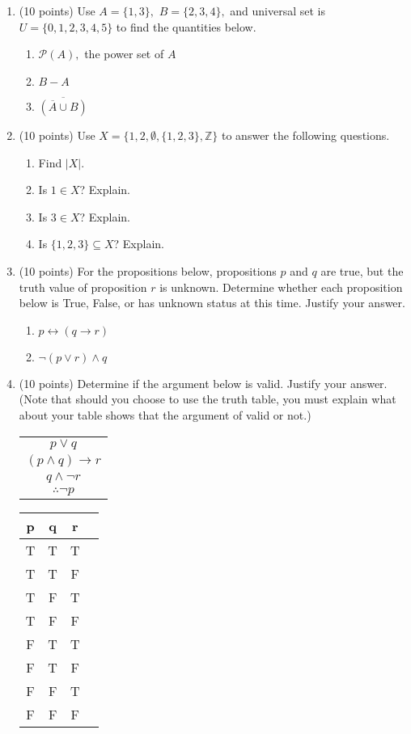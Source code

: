 \documentclass[12pt]{article}
\def\ZZ{{\mathbb Z}}
\newcommand{\be}{\begin{enumerate}}
\newcommand{\ee}{\end{enumerate}}
\begin{document}
\newpage
\begin{enumerate}
\item (10 points) Use $A=\{1,3\},$ $B=\{2,3,4\},$ and universal set is $U=\{0,1,2,3,4,5\}$ to find the quantities below.
\be
\item $\mathcal{P}(A),$ the power set of $A$ 
\vfill
\item $B - A$
\vfill
\item $\overline{(\overline{A} \cup {B})}$ 
\vfill
\ee
\item (10 points) Use $X=\{1,2,\emptyset, \{1,2,3\},\ZZ\}$ to answer the following questions.
\be
\item Find $|X|.$\\
\vspace{.5in}
\item Is $1 \in X$? Explain.\\
\vspace{.5in}
\item Is $3 \in X$? Explain.\\
\vspace{.5in}
\item Is $\{1,2,3\} \subseteq X$? Explain.\\
\vspace{.5in}
\ee
\item (10 points) For the propositions below, propositions $p$ and $q$ are true, but the truth value of proposition $r$ is unknown. Determine whether each proposition below is True, False, or has unknown status at this time. Justify your answer.
\be
\item $p \leftrightarrow (q \rightarrow r)$
\vfill
\item $\neg(p \vee r) \wedge q$
\vfill
\ee
\newpage

\item (10 points) Determine if the argument below is valid. Justify your answer. (Note that should you choose to use the truth table, you must explain what about your table shows that the argument of valid or not.)\\

\begin{tabular}{c}
$p\vee q$\\
$(p\wedge q) \rightarrow r$\\
$q \wedge \neg r $\\
\hline
$\therefore \neg p$\\
\end{tabular}
\hspace{.5in}
\begin{tabular}{|c|c|c|p{10cm}|}
p&q&r&\\
\hline \hline
T&T&T&\\
\hline
T&T&F&\\
\hline
T&F&T&\\
\hline
T&F&F&\\
\hline
F&T&T&\\
\hline
F&T&F&\\
\hline
F&F&T&\\
\hline
F&F&F&\\
\hline
\end{tabular}
\vfill


\end{enumerate}
\end{document}

